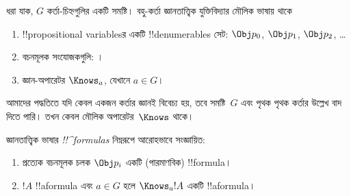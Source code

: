 \documentclass[../../../include/open-logic-section]{subfiles}
\begin{document}


\begin{defn}
ধরা যাক, $G$ কর্তা-চিহ্নগুলির একটি সমষ্টি। বহু-কর্তা জ্ঞানতাত্ত্বিক যুক্তিবিদ্যার মৌলিক ভাষায় থাকে
\begin{enumerate}
  \item !!{propositional variable}sর একটি !!{denumerable}s সেট: $\Obj
    p_0$, $\Obj p_1$, $\Obj p_2$, \dots
  \item বচনমূলক সংযোজকগুলি: \startycommalist
  ।
  \item জ্ঞান-অপারেটর $\Knows_a$, যেখানে $a \in G$।
\end{enumerate}
\end{defn}

আমাদের পদ্ধতিতে যদি কেবল একজন কর্তার জ্ঞানই বিবেচ্য হয়, তবে সমষ্টি~$G$ এবং পৃথক পৃথক কর্তার উল্লেখ বাদ দিতে পারি। তখন কেবল মৌলিক অপারেটর~$\Knows$ থাকে।

\begin{defn}
জ্ঞানতাত্ত্বিক ভাষার \emph{!!^{formula}s} নিম্নরূপে আরোহভাবে সংজ্ঞায়িত:
\begin{enumerate}


\item প্রত্যেক বচনমূলক চলক $\Obj p_i$ একটি (পারমাণবিক) !!{formula}।






\item $!A$ !!a{formula} এবং $a \in G$ হলে $\Knows_a !A$
  একটি !!a{formula}।

\end{enumerate}
\end{defn}
\end{document}
